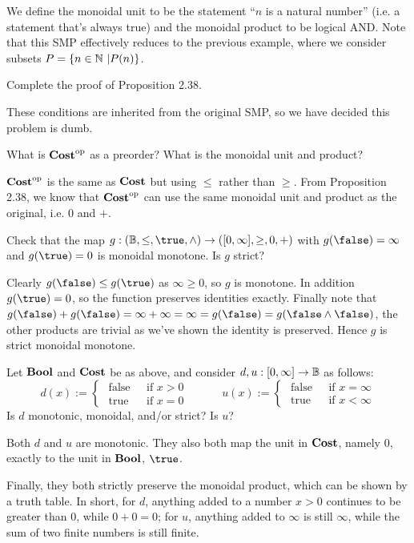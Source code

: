\solution
We define the monoidal unit to be the statement ``$n$ is a natural number'' (i.e. a statement that's always true) and the monoidal product to be logical AND.  Note that this SMP effectively reduces to the previous example, where we consider subsets $P = \{n\in\mathbb{N}\ | P(n)\}$.

Complete the proof of Proposition 2.38.

\solution
These conditions are inherited from the original SMP, so we have decided this problem is dumb.

What is $\textbf{Cost}^\textrm{op}$ as a preorder?  What is the monoidal unit and product?

\solution
$\textbf{Cost}^\textrm{op}$ is the same as $\textbf{Cost}$ but using $\leq$ rather than $\geq$.  From Proposition 2.38, we know that $\textbf{Cost}^\textrm{op}$ can use the same monoidal unit and product as the original, i.e. $0$ and $+$.

Check that the map $g:(\B, \leq, \true, \land)\to([0,\infty],\geq,0,+)$ with $g(\false) = \infty$ and $g(\true)=0$ is monoidal monotone.  Is $g$ strict?

\solution
Clearly $g(\false)\leq g(\true)$ as $\infty\geq 0$, so $g$ is monotone.  In addition $g(\true)=0$, so the function preserves identities exactly.  Finally note that $g(\false)+g(\false) = \infty + \infty = \infty = g(\false)=g(\false\land\false)$, the other products are trivial as we've shown the identity is preserved.  Hence $g$ is strict monoidal monotone.

Let $\textbf{Bool}$ and $\textbf{Cost}$ be as above, and consider $d,u:[0,\infty]\to\mathbb{B}$ as follows:
$$d(x):=\left\{\begin{array}{ll}\text { false } & \text { if } x>0 \\ \text { true } & \text { if } x=0\end{array} \quad\quad\quad u(x):=\left\{\begin{array}{ll}\text { false } & \text { if } x=\infty \\ \text { true } & \text { if } x<\infty\end{array}\right.\right.$$
Is $d$ monotonic, monoidal, and/or strict?  Is $u$?

\solution
Both $d$ and $u$ are monotonic.  They also both map the unit in $\textbf{Cost}$, namely $0$, exactly to the unit in $\textbf{Bool}$, $\true$.

Finally, they both strictly preserve the monoidal product, which can be shown by a truth table.  In short, for $d$, anything added to a number $x>0$ continues to be greater than 0, while $0+0=0$; for $u$, anything added to $\infty$ is still $\infty$, while the sum of two finite numbers is still finite.

